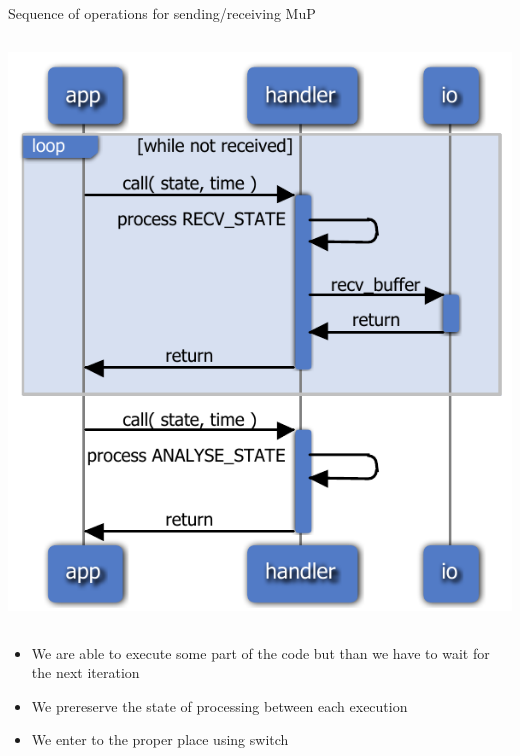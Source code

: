 \documentclass{beamer}
\begin{document}
\begin{frame}{Sequence of operations for sending/receiving MuP}
\begin{columns}
\begin{column}{0.5\textwidth}
\begin{block}
            \centerline{\includegraphics[height=0.5\textheight]{slides/send_recv2.pdf}}
         \end{block}
      \end{column}
   \end{columns}
   \begin{columns}
      \begin{column}{1.0\textwidth}
         \begin{scriptsize}
            \begin{itemize}[<+->]
               \item We are able to execute some part of the code but than we have to wait for the next iteration
               \item We prereserve the state of processing between each execution
               \item We enter to the proper place using switch
            \end{itemize}
         \end{scriptsize}
      \end{column}
   \end{columns}
\end{frame}
\end{document}
